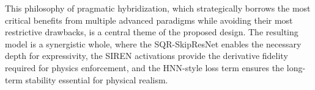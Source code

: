 This philosophy of pragmatic hybridization, which strategically borrows the most critical benefits from multiple advanced paradigms while avoiding their most restrictive drawbacks, is a central theme of the proposed design. The resulting model is a synergistic whole, where the SQR-SkipResNet enables the necessary depth for expressivity, the SIREN activations provide the derivative fidelity required for physics enforcement, and the HNN-style loss term ensures the long-term stability essential for physical realism.
